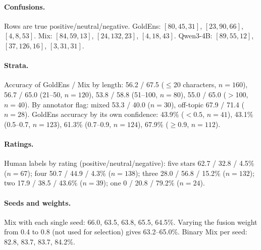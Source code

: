 \paragraph{Confusions.} Rows are true positive/neutral/negative.
GoldEns: $[80,45,31]$, $[23,90,66]$, $[4,8,53]$. Mix: $[84,59,13]$,
$[24,132,23]$, $[4,18,43]$. Qwen3-4B: $[89,55,12]$, $[37,126,16]$,
$[3,31,31]$.

\paragraph{Strata.} Accuracy of GoldEns / Mix by length: 56.2 / 67.5
($\leq$20 characters, $n{=}160$), 56.7 / 65.0 (21--50, $n{=}120$),
53.8 / 58.8 (51--100, $n{=}80$), 55.0 / 65.0 ($>$100, $n{=}40$). By
annotator flag: mixed 53.3 / 40.0 ($n{=}30$), off-topic 67.9 / 71.4
($n{=}28$). GoldEns accuracy by its own confidence: 43.9\% ($<0.5$,
$n{=}41$), 43.1\% (0.5--0.7, $n{=}123$), 61.3\% (0.7--0.9,
$n{=}124$), 67.9\% ($\geq 0.9$, $n{=}112$).

\paragraph{Ratings.} Human labels by rating
(positive/neutral/negative): five stars 62.7 / 32.8 / 4.5\%
($n{=}67$); four 50.7 / 44.9 / 4.3\% ($n{=}138$); three 28.0 / 56.8 /
15.2\% ($n{=}132$); two 17.9 / 38.5 / 43.6\% ($n{=}39$); one 0 / 20.8
/ 79.2\% ($n{=}24$).

\paragraph{Seeds and weights.} Mix with each single seed: 66.0, 63.5,
63.8, 65.5, 64.5\%. Varying the fusion weight from 0.4 to 0.8 (not
used for selection) gives 63.2--65.0\%. Binary Mix per seed: 82.8,
83.7, 83.7, 84.2\%.

